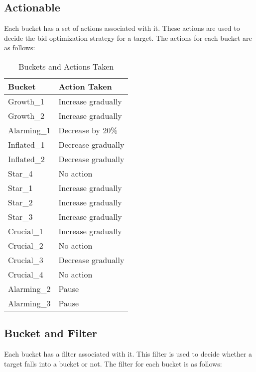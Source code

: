\subsection{Actionable}

Each bucket has a set of actions associated with it. These actions are used to decide the bid optimization strategy for a target. The actions for each bucket are as follows:

\begin{table}[ht]
    \centering
    \begin{tabular}{|l|l|}
        \hline
        \textbf{Bucket} & \textbf{Action Taken} \\
        \hline
        Growth\_1       & Increase gradually    \\
        Growth\_2       & Increase gradually    \\
        Alarming\_1     & Decrease by 20\%      \\
        Inflated\_1     & Decrease gradually    \\
        Inflated\_2     & Decrease gradually    \\
        Star\_4         & No action             \\
        Star\_1         & Increase gradually    \\
        Star\_2         & Increase gradually    \\
        Star\_3         & Increase gradually    \\
        Crucial\_1      & Increase gradually    \\
        Crucial\_2      & No action             \\
        Crucial\_3      & Decrease gradually    \\
        Crucial\_4      & No action             \\
        Alarming\_2     & Pause                 \\
        Alarming\_3     & Pause                 \\
        \hline
    \end{tabular}
    \caption{Buckets and Actions Taken}
    \label{tab:bucket_and_action}
\end{table}

\subsection{Bucket and Filter}

Each bucket has a filter associated with it. This filter is used to decide whether a target falls into a bucket or not. The filter for each bucket is as follows:

